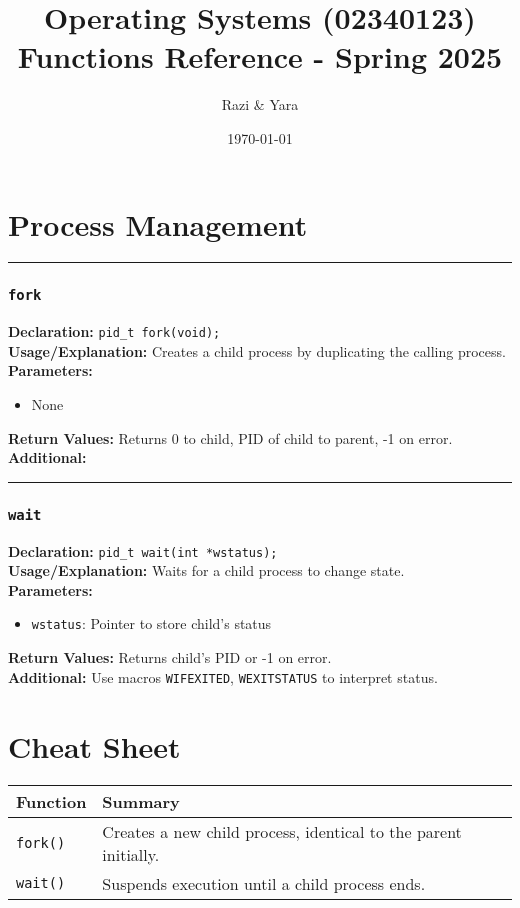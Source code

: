 \documentclass[12pt]{article}
\title{Operating Systems (02340123)\\ Functions Reference - Spring 2025}
\author{Razi \& Yara}
\date{\today}
\newcommand{\functionentry}[6]{%
  \noindent\rule{\linewidth}{0.5pt}
  \subsubsection*{\texttt{#1}}
  \textbf{Declaration:} \texttt{#2} \\
  \textbf{Usage/Explanation:} #3 \\
  \textbf{Parameters:}
  \begin{itemize}[leftmargin=*]
    #4
  \end{itemize}
  \textbf{Return Values:} #5 \\
  \textbf{Additional:} #6
  \vspace{1em}
}
\begin{document}
\maketitle
\tableofcontents
\newpage

\section{Process Management}

\functionentry{fork}
{pid\_t fork(void);}
{Creates a child process by duplicating the calling process.}
{\item None}
{Returns 0 to child, PID of child to parent, -1 on error.}
{\label{fork}}

\functionentry{wait}
{pid\_t wait(int *wstatus);}
{Waits for a child process to change state.}
{\item \texttt{wstatus}: Pointer to store child's status}
{Returns child's PID or -1 on error.}
{Use macros \texttt{WIFEXITED}, \texttt{WEXITSTATUS} to interpret status.\label{func:wait}}


\newpage
\section*{Cheat Sheet}
\begin{longtable}{|l|p{11cm}|}
  \hline
  \textbf{Function} & \textbf{Summary}                                                \\
  \hline
  \texttt{fork()}   & Creates a new child process, identical to the parent initially. \\
  \texttt{wait()}   & Suspends execution until a child process ends.                  \\
  \hline
\end{longtable}
\end{document}
